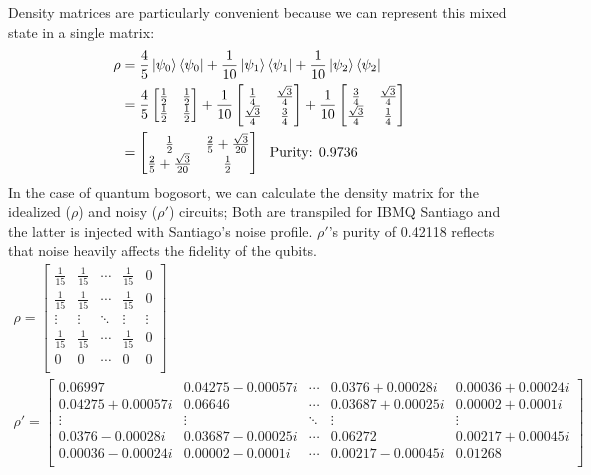 \documentclass[12pt]{article}
\begin{document}
Density matrices are particularly convenient because we can represent this mixed state in a single matrix:
\begin{align*}
    \rho &= \frac{4}{5} \ket{\psi_0}\bra{\psi_0} + \frac{1}{10} \ket{\psi_1}\bra{\psi_1} + \frac{1}{10} \ket{\psi_2}\bra{\psi_2} \\
    &= \frac{4}{5} \begin{bmatrix} \frac{1}{2} & \frac{1}{2} \\ \frac{1}{2} & \frac{1}{2} \end{bmatrix} + \frac{1}{10} \begin{bmatrix} \frac{1}{4} & \frac{\sqrt{3}}{4} \\ \frac{\sqrt{3}}{4} & \frac{3}{4} \\ \end{bmatrix} + \frac{1}{10} \begin{bmatrix} \frac{3}{4} & \frac{\sqrt{3}}{4} \\ \frac{\sqrt{3}}{4} & \frac{1}{4} \\ \end{bmatrix} \\
    &= \begin{bmatrix} \frac{1}{2} & \frac{2}{5} + \frac{\sqrt{3}}{20} \\ \frac{2}{5} + \frac{\sqrt{3}}{20} & \frac{1}{2} \\ \end{bmatrix} \ \ \text{Purity: 0.9736}
\end{align*}
In the case of quantum bogosort, we can calculate the density matrix for the idealized ($\rho$) and noisy ($\rho'$) circuits; Both are transpiled for IBMQ Santiago and the latter is injected with Santiago's noise profile. $\rho'$'s purity of 0.42118 reflects that noise heavily affects the fidelity of the qubits.
\begin{gather*}
    \rho = \begin{bmatrix}
        \frac{1}{15} & \frac{1}{15} & \cdots & \frac{1}{15} & 0 \\
        \frac{1}{15} & \frac{1}{15} & \cdots & \frac{1}{15} & 0 \\
        \vdots & \vdots & \ddots & \vdots & \vdots \\
        \frac{1}{15} & \frac{1}{15} & \cdots & \frac{1}{15} & 0 \\
        0 & 0 & \cdots & 0 & 0 \\
    \end{bmatrix} \\
    \rho' = \begin{bmatrix}
        0.06997 & 0.04275 - 0.00057i & \cdots & 0.0376 + 0.00028i & 0.00036 + 0.00024i  \\
        0.04275 + 0.00057i & 0.06646 & \cdots & 0.03687 + 0.00025i & 0.00002 + 0.0001i  \\
        \vdots & \vdots & \ddots & \vdots & \vdots \\
        0.0376 - 0.00028i & 0.03687 - 0.00025i & \cdots & 0.06272 & 0.00217 + 0.00045i  \\
        0.00036 - 0.00024i & 0.00002 - 0.0001i & \cdots & 0.00217 - 0.00045i & 0.01268  \\
    \end{bmatrix}
\end{gather*}
\end{document}

